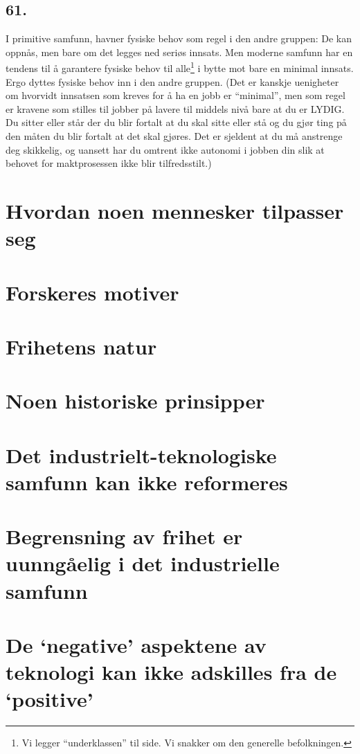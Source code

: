 \documentclass[oneside]{book}
\begin{document}
\section*{61.}
I primitive samfunn, havner fysiske behov som regel i den andre gruppen: De kan
oppnås, men bare om det legges ned seriøs innsats. Men moderne samfunn har en
tendens til å garantere fysiske behov til alle\footnote{Vi legger
``underklassen'' til side. Vi snakker om den generelle befolkningen.} i bytte
mot bare en minimal innsats. Ergo dyttes fysiske behov inn i den andre gruppen.
(Det er kanskje uenigheter om hvorvidt innsatsen som kreves for å ha en jobb er
``minimal'', men som regel er kravene som stilles til jobber på lavere til
middels nivå bare at du er LYDIG. Du sitter eller står der du blir fortalt at
du skal sitte eller stå og du gjør ting på den måten du blir fortalt at det
skal gjøres. Det er sjeldent at du må anstrenge deg skikkelig, og uansett har
du omtrent ikke autonomi i jobben din slik at behovet for maktprosessen ikke
blir tilfredsstilt.)

\chapter{Hvordan noen mennesker tilpasser seg}

\chapter{Forskeres motiver}

\chapter{Frihetens natur}

\chapter{Noen historiske prinsipper}

\chapter{Det industrielt-teknologiske samfunn kan ikke reformeres}

\chapter{Begrensning av frihet er uunngåelig i det industrielle samfunn}

\chapter{De `negative' aspektene av teknologi kan ikke adskilles fra de `positive'}
\end{document}

